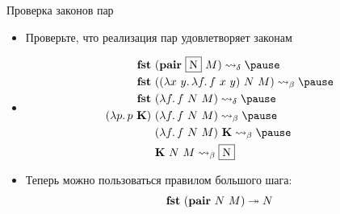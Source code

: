     \begin{frame}[fragile]{Проверка законов пар}
        \begin{itemize}
            \item[\todo] Проверьте, что реализация пар удовлетворяет законам
            \item[\answer] \pause
            \begin{align*}
                \term{fst} \ap &(\term{pair} \ap \framebox{N} \ap M)
                \step_\delta \pause \\
                \term{fst} \ap &((\lambda x~y\ldotp \lambda f \ldotp f \ap x \ap y) \ap N \ap M)
                \step_\beta \pause \\
                \term{fst} \ap &(\lambda f \ldotp f \ap N \ap M)
                \step_\delta \pause \\
                (\lambda p \ldotp p \ap \term{K}) \ap &(\lambda f \ldotp f \ap N \ap M)
                \step_\beta \pause \\
                &(\lambda f \ldotp f \ap N \ap M) \ap \term{K}
                \step_\beta \pause \\
                &\term{K} \ap N \ap M \step_{\beta} \framebox{N}
            \end{align*}
            \item Теперь можно пользоваться правилом большого шага:
            \begin{equation*}
                \mathbf{fst} ~ (\mathbf{pair} ~ N ~ M) \twoheadrightarrow N
            \end{equation*}
        \end{itemize}
    \end{frame}

